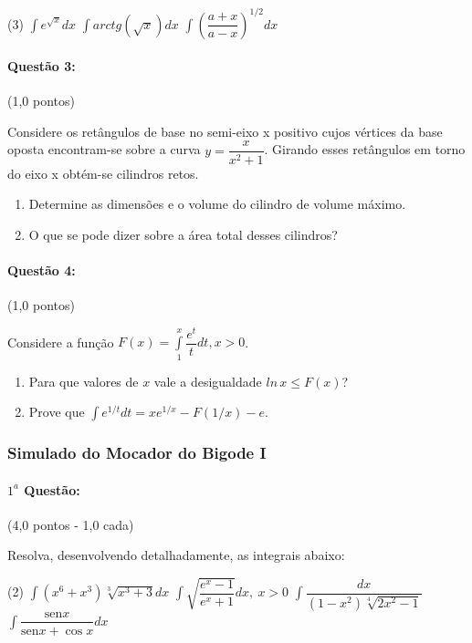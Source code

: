 \documentclass[12pt,a4paper]{article}
\newcommand{\sen}{\mathrm{sen}}
\begin{document}
\begin{tasks}(3)
\task $\displaystyle\int e^{\sqrt{x}}dx$ 
\task $\displaystyle\int arctg(\sqrt{x})dx$ 
\task $\displaystyle\int \left(\dfrac{a+x}{a-x}\right)^{1/2}dx$
\end{tasks}

\paragraph{Questão 3:} (1,0 pontos)

Considere os retângulos de base no semi-eixo x positivo cujos vértices da base oposta encontram-se sobre a curva $y=\dfrac{x}{x^2+1}$. Girando esses retângulos em torno do eixo x obtém-se cilindros retos.
\begin{enumerate}[label=(\alph*)]
\item Determine as dimensões e o volume do cilindro de volume máximo.
\item O que se pode dizer sobre a área total desses cilindros?
\end{enumerate}

\paragraph{Questão 4:} (1,0 pontos)

Considere a função $F(x)=\displaystyle\int\limits_1^x \dfrac{e^t}{t}dt,x>0$.
\begin{enumerate}[label=(\alph*)]
\item Para que valores de $x$ vale a desigualdade $ln\,x\leq F(x)$?
\item Prove que $\displaystyle\int e^{1/t}dt = xe^{1/x}-F(1/x)-e$.
\end{enumerate}
\newpage

\subsubsection{Simulado do Mocador do Bigode I}
\paragraph{$1^a$ Questão:} (4,0 pontos - 1,0 cada)

Resolva, desenvolvendo detalhadamente, as integrais abaixo:
\begin{tasks}(2)
\task $\displaystyle\int (x^6+x^3)\sqrt[3]{x^3+3} dx$ 
\task $\displaystyle\int \sqrt{\dfrac{e^x-1}{e^x+1}}dx, \ x>0$ 
\task $\displaystyle\int \dfrac{dx}{(1-x^2)\sqrt[4]{2x^2-1}}$
\task $\displaystyle\int \dfrac{\sen{x}}{\sen{x} + \cos{x}}dx$
\end{tasks}
\end{document}
